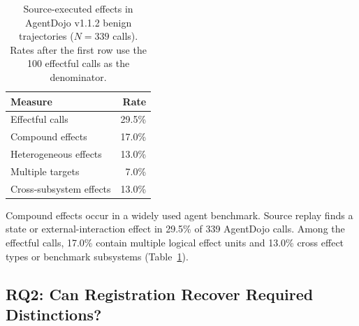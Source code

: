 \documentclass[letterpaper,twocolumn,10pt]{article}
\theoremstyle{definition}
\begin{document}
\begin{table}[t]
\centering
\small
\caption{Source-executed effects in AgentDojo v1.1.2 benign trajectories
($N=339$ calls).  Rates after the first row use the 100 effectful calls as the
denominator.}
\label{tab:agentdojo-effect-prevalence}
\begin{tabular}{lr}
\toprule
Measure & Rate \\
\midrule
Effectful calls & 29.5\% \\
Compound effects & 17.0\% \\
Heterogeneous effects & 13.0\% \\
Multiple targets & 7.0\% \\
Cross-subsystem effects & 13.0\% \\
\bottomrule
\end{tabular}
\end{table}


Compound effects occur in a widely used agent benchmark.  Source replay finds
a state or external-interaction effect in 29.5\% of 339 AgentDojo calls.  Among
the effectful calls, 17.0\% contain multiple logical effect units and 13.0\%
cross effect types or benchmark subsystems
(Table~\ref{tab:agentdojo-effect-prevalence}).

\subsection{RQ2: Can Registration Recover Required Distinctions?}
\end{document}
